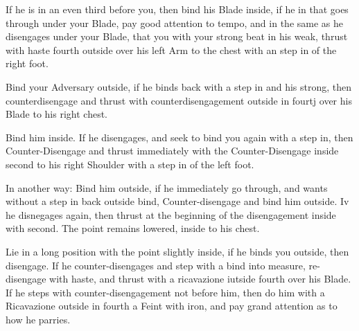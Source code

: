 \exercise{}
If he is in an even third before you, then bind his Blade inside, if
he in that goes through under your Blade, pay good attention to tempo,
and in the same as he disengages under your Blade, that you with your
strong beat in his weak, thrust with haste fourth outside over his
left Arm to the chest with an step in of the right foot.

\exercise{}

Bind your Adversary outside, if he binds back with a step in and his
strong, then counterdisengage and thrust with counterdisengagement
outside in fourtj over his Blade to his right chest.

\exercise{}
Bind him inside. If he disengages, and seek to bind you again with a
step in, then Counter-Disengage and thrust immediately with the
Counter-Disengage inside second to his right Shoulder with a step in
of the left foot.

\exercise{}
In another way: Bind him outside, if he immediately go through, and
wants without a step in back outside bind, Counter-disengage and bind
him outside. Iv he disnegages again, then thrust at the beginning of
the disengagement inside with second. The point remains lowered,
inside to his chest.

\exercise{}
Lie in a long position with the point slightly inside, if he binds you
outside, then disengage. If he counter-disengages and step with a bind
into measure, re-disengage with haste, and thrust with a ricavazione
iutside fourth over his Blade. If he steps with counter-disengagement
not before him, then do him with a Ricavazione outside in fourth a
Feint with iron, and pay grand attention as to how he parries.
